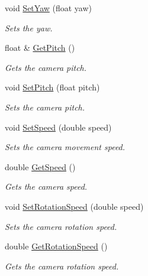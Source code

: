 \begin{CompactItemize}
void \hyperlink{class_camera_0f3853ee0b4a1c1fcf3c136decbbe056}{SetYaw} (float yaw)
\begin{CompactList}\small\item\em Sets the yaw. \item\end{CompactList}\item 
float \& \hyperlink{class_camera_7cdeaf63fbab2011eca767f238668a06}{GetPitch} ()
\begin{CompactList}\small\item\em Gets the camera pitch. \item\end{CompactList}\item 
void \hyperlink{class_camera_bd3daba04eb01231eec1d5fdbe862d52}{SetPitch} (float pitch)
\begin{CompactList}\small\item\em Sets the camera pitch. \item\end{CompactList}\item 
void \hyperlink{class_camera_8cb555aeca85fcd988978105178cc0f3}{SetSpeed} (double speed)
\begin{CompactList}\small\item\em Sets the camera movement speed. \item\end{CompactList}\item 
double \hyperlink{class_camera_6d305ab5442a489253a321b2a45b11b6}{GetSpeed} ()
\begin{CompactList}\small\item\em Gets the camera speed. \item\end{CompactList}\item 
void \hyperlink{class_camera_bce25d2360c703fb5ac6da02d3991bda}{SetRotationSpeed} (double speed)
\begin{CompactList}\small\item\em Sets the camera rotation speed. \item\end{CompactList}\item 
double \hyperlink{class_camera_eebe84aaf8b615505ef2ad7f7bbffbb9}{GetRotationSpeed} ()
\begin{CompactList}\small\item\em Gets the camera rotation speed. \item\end{CompactList}\item 

\end{CompactItemize}

